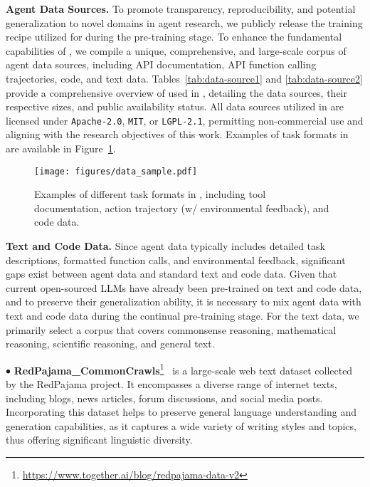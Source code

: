 \noindent \textbf{Agent Data Sources.}
To promote transparency, reproducibility, and potential generalization to novel domains in agent research, we publicly release the training recipe utilized for \dataset during the pre-training stage. To enhance the fundamental capabilities of \method, we compile a unique, comprehensive, and large-scale corpus of agent data sources, including API documentation, API function calling trajectories, code, and text data. Tables~\ref{tab:data-source1} and \ref{tab:data-source2} provide a comprehensive overview of \dataset used in \method, detailing the data sources, their respective sizes, and public availability status. 
All data sources utilized in \dataset are licensed under \texttt{Apache-2.0}, \texttt{MIT}, or \texttt{LGPL-2.1}, permitting non-commercial use and aligning with the research objectives of this work.
Examples of task formats in \dataset are available in Figure~\ref{fig:datasample}.

\begin{figure}[ht]
  \centering
  \texttt{[image: figures/data\_sample.pdf]}
  \caption{
  Examples of different task formats in \dataset, including tool documentation, action trajectory (w/ environmental feedback), and code data. 
  }
  \label{fig:datasample}
\end{figure}

% 

\noindent \textbf{Text and Code Data.}
Since agent data typically includes detailed task descriptions, formatted function calls, and environmental feedback, significant gaps exist between agent data and standard text and code data. Given that current open-sourced LLMs have already been pre-trained on text and code data, and to preserve their generalization ability, it is necessary to mix agent data with text and code data during the continual pre-training stage. For the text data, we primarily select a corpus that covers commonsense reasoning, mathematical reasoning, scientific reasoning, and general text.

\noindent$\bullet$ \textbf{RedPajama\_CommonCrawls}\footnote{\url{https://www.together.ai/blog/redpajama-data-v2}}~\cite{raffel2020exploring} is a large-scale web text dataset collected by the RedPajama project. It encompasses a diverse range of internet texts, including blogs, news articles, forum discussions, and social media posts. Incorporating this dataset helps to preserve general language understanding and generation capabilities, as it captures a wide variety of writing styles and topics, thus offering significant linguistic diversity.

